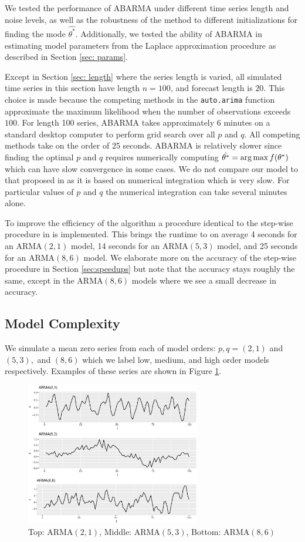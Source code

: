 We tested the performance of ABARMA under different time series length and noise levels, as well as the robustness of the method to different initializations for finding the mode $\hat{\theta^*}$. Additionally, we tested the ability of ABARMA in estimating model parameters from the Laplace approximation procedure as described in Section \ref{sec: params}.

Except in Section \ref{sec: length} where the series length is varied, all simulated time series in this section have length $n=100$, and forecast length is $20$. This choice is made because the competing methods in the {\tt auto.arima} function approximate the maximum likelihood when the number of observations exceeds $100$. For length 100 series, ABARMA takes approximately 6 minutes on a standard desktop computer to perform grid search over all $p$ and $q$. All competing methods take on the order of 25 seconds.  ABARMA is relatively slower since finding the optimal $p$ and $q$ requires numerically computing  $\hat{\theta^*} = \operatorname*{arg\,max} f(\theta^*)$ which can have slow convergence in some cases.  We do not compare our model to that proposed in \cite{monahan1982} as it is based on numerical integration which is very slow.  For particular values of $p$ and $q$ the numerical integration can take several minutes alone.

To improve the efficiency of the algorithm a procedure identical to the step-wise procedure in \cite{hyndman2008} is implemented.  This brings the runtime to on average 4 seconds for an ARMA$(2,1)$ model, 14 seconds for an ARMA$(5,3)$ model, and 25 seconds for an ARMA$(8,6)$ model.  We elaborate more on the accuracy of the step-wise procedure in Section \ref{sec:speedups} but note that the accuracy stays roughly the same, except in the ARMA$(8,6)$ models where we see a small decrease in accuracy.
 

\subsection{Model Complexity}
\label{sec: complexity}

We simulate a mean zero series from each of model orders: $p, q = (2,1)$ and $(5,3),$ and $(8,6)$ which we label low, medium, and high order models respectively. Examples of these series are shown in Figure \ref{sample}.

\begin{figure}
    \includegraphics[width=3in]{armaLMH.eps}
    \caption{Top: ARMA$(2,1)$, Middle: ARMA$(5,3)$, Bottom: ARMA$(8,6)$}
    \label{sample}
\end{figure}

